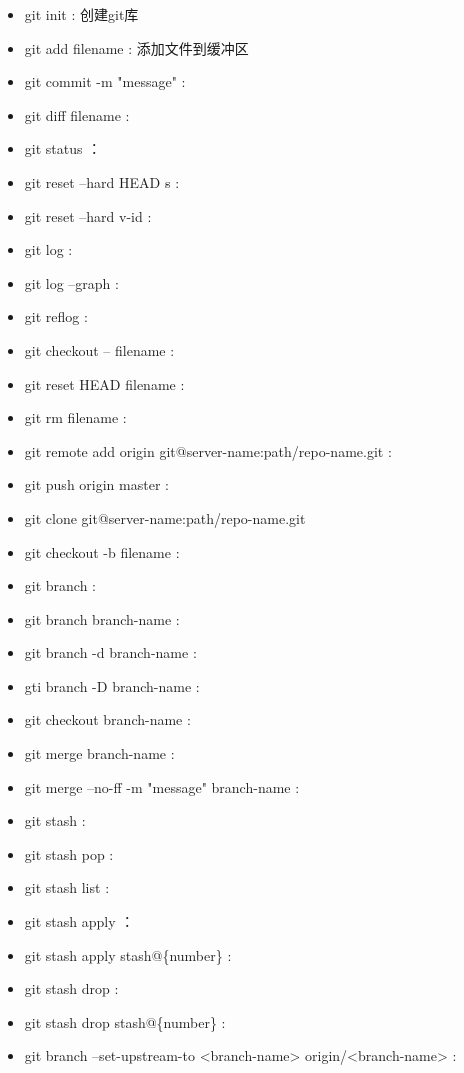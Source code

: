 \documentclass[12pt,twoside]{report}
\begin{document}
\begin{leftbar}
    \begin{itemize}
        \item git init : 创建git库
        \item git add filename : 添加文件到缓冲区
        \item git commit -m "message" : 
        \item git diff filename :
        \item git status ：
        \item git reset --hard HEAD s$\hat{}$ :
        \item git reset --hard v-id :
        \item git log :
        \item git log --graph :
        \item git reflog :
        \item git checkout -- filename :
        \item git reset HEAD filename :
        \item git rm filename :
        \item git remote add origin git@server-name:path/repo-name.git : 
        \item git push origin master : 
        \item git clone git@server-name:path/repo-name.git
        \item git checkout -b filename :
        \item git branch :
        \item git branch branch-name :
        \item git branch -d branch-name :
        \item gti branch -D branch-name :
        \item git checkout branch-name :
        \item git merge branch-name :
        \item git merge --no-ff -m "message" branch-name :
        \item git stash :
        \item git stash pop :
        \item git stash list :
        \item git stash apply ：
        \item git stash apply stash@\{number\} :
        \item git stash drop :
        \item git stash drop stash@\{number\} :
        \item git branch --set-upstream-to <branch-name> origin/<branch-name> :

\end{itemize}
\end{leftbar}
\end{document}
